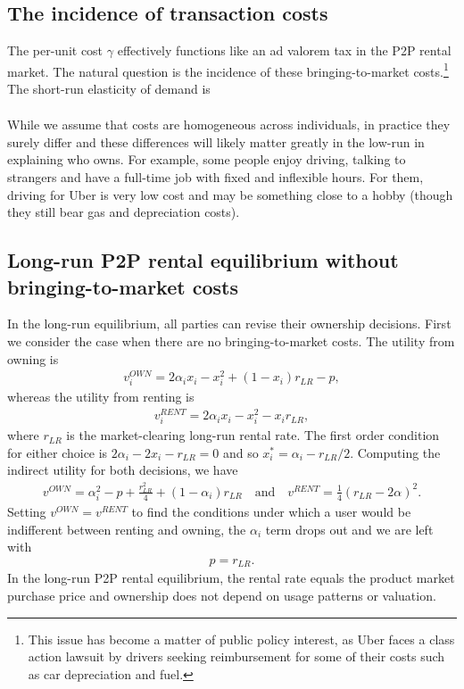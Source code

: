 \documentclass[11pt]{article}
\begin{document}
\subsection{The incidence of transaction costs}
The per-unit cost $\gamma$ effectively functions like an ad valorem tax in the P2P rental market.
The natural question is the incidence of these bringing-to-market costs.\footnote{
 This issue has become a matter of public policy interest, as Uber faces a class action lawsuit by drivers seeking reimbursement for some of their costs such as car depreciation and fuel. 
}
The short-run elasticity of demand is
\begin{align}

\end{align}

While we assume that costs are homogeneous across individuals, in practice they surely differ and these differences will likely matter greatly in the low-run in explaining who owns. 
For example, some people enjoy driving, talking to strangers and have a full-time job with fixed and inflexible hours.
For them, driving for Uber is very low cost and may be something close to a hobby (though they still bear gas and depreciation costs).

\subsection{Long-run P2P rental equilibrium without bringing-to-market costs} 
In the long-run equilibrium, all parties can revise their ownership decisions. 
First we consider the case when there are no bringing-to-market costs.
The utility from owning is 
\begin{align}
v^{OWN}_i = 2\alpha_i x_i - x_i^2 + (1-x_i)r_{LR} - p,   
\end{align} 
whereas the utility from renting is 
\begin{align}
v^{RENT}_{i} = 2\alpha_i x_i - x_i^2 - x_i r_{LR}, 
\end{align} 
where $r_{LR}$ is the market-clearing long-run rental rate. 
The first order condition for either choice is $2 \alpha_i - 2 x_i - r_{LR} = 0$ and so $x^*_i = \alpha_i - r_{LR}/2$. 
Computing the indirect utility for both decisions, we have
\begin{align} 
v^{OWN} = \alpha_i^2 - p + \frac{r_{LR}^2}{4} + (1 - \alpha_i) r_{LR} \quad  \mbox{and} \quad v^{RENT} = \frac{1}{4} (r_{LR}- 2\alpha )^2. 
\end{align} 
Setting $v^{OWN} = v^{RENT}$ to find the conditions under which a user would be indifferent between renting and owning, the $\alpha_i$ term drops out and we are left with 
\begin{align}
p = r_{LR}. 
\end{align}
In the long-run P2P rental equilibrium, the rental rate equals the product market purchase price and ownership does not depend on usage patterns or valuation.  
\end{document}

